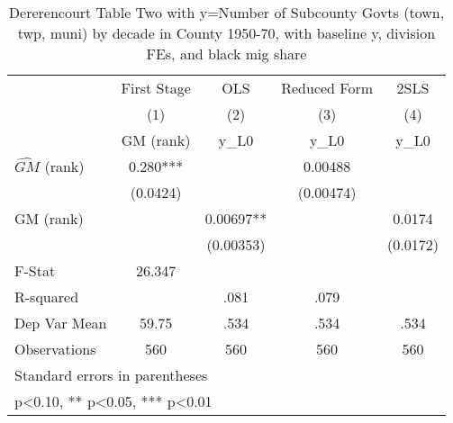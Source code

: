 \begin{table}[htbp]\centering
\def\sym#1{\ifmmode^{#1}\else\(^{#1}\)\fi}
\caption{Dererencourt Table Two with y=Number of Subcounty Govts (town, twp, muni) by decade in County 1950-70, with baseline y, division FEs, and black mig share}
\begin{tabular}{l*{4}{c}}
\toprule
                    & First Stage   &         OLS   &Reduced Form   &        2SLS   \\
                    &\multicolumn{1}{c}{(1)}&\multicolumn{1}{c}{(2)}&\multicolumn{1}{c}{(3)}&\multicolumn{1}{c}{(4)}\\
                    &\multicolumn{1}{c}{GM  (rank)}&\multicolumn{1}{c}{y\_L0}&\multicolumn{1}{c}{y\_L0}&\multicolumn{1}{c}{y\_L0}\\
\midrule
$\hat{GM}$ (rank)   &       0.280***&               &     0.00488   &               \\
                    &    (0.0424)   &               &   (0.00474)   &               \\
\addlinespace
GM  (rank)          &               &     0.00697** &               &      0.0174   \\
                    &               &   (0.00353)   &               &    (0.0172)   \\
\midrule
F-Stat              &      26.347   &               &               &               \\
R-squared           &               &        .081   &        .079   &               \\
Dep Var Mean        &       59.75   &        .534   &        .534   &        .534   \\
Observations        &         560   &         560   &         560   &         560   \\
\bottomrule
\multicolumn{5}{l}{\footnotesize Standard errors in parentheses}\\
\multicolumn{5}{l}{\footnotesize * p<0.10, ** p<0.05, *** p<0.01}\\
\end{tabular}
\end{table}
